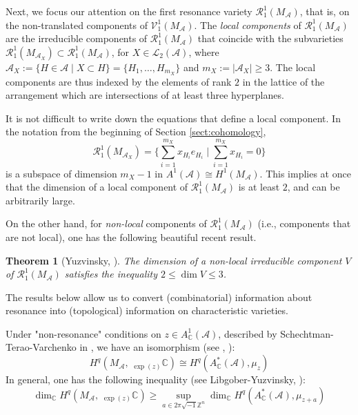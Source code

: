 \documentclass[psamsfonts]{conm-p-l}
\newtheorem{theorem}{Theorem}[section]
\theoremstyle{definition}
\theoremstyle{remark}
\numberwithin{equation}{section}
\newcommand{\A}{{\mathcal A}}
\newcommand{\RR}{{\mathcal R}}
\newcommand{\VV}{{\mathcal V}}
\newcommand{\Z}{\mathbb{Z}}
\newcommand{\C}{\mathbb{C}}
\begin{document}
Next, we focus our attention on the first resonance variety $\RR_{1}^{1}(M_{\A})$, 
that is, on the non-translated components of $\VV_{1}^{1}(M_{\A})$.
The {\it local components} of $\RR_{1}^{1}(M_{\A})$ are the irreducible components
of $\RR_{1}^{1}(M_{\A})$ that coincide with the subvarieties 
$\RR_{1}^{1}(M_{\A_{X}}) \subset \RR_{1}^{1}(M_{\A})$, for  $X\in \mathcal L_2(\A)$, 
where $\A_{X}:=\{H \in \A\;|\;X \subset H\}= \{ H_1, \dots, H_{m_X}\}$
and $m_X:=|\A_{X}| \geq 3$.  
The local components are thus indexed by the elements of rank $2$ in the lattice of
the arrangement which are intersections of at least three hyperplanes.

It is not difficult to write down the equations that define a local component.
In the notation from the beginning of Section \ref{sect:cohomology},
%
\begin{equation}
\label{RAx}
\RR_{1}^{1}(M_{\A_{X}})=\{ \sum_{i=1}^{m_X}x_{H_i}e_{H_i}\;|\;\sum_{i=1}^{m_X}x_{H_i}=0\}
\end{equation}
is a subspace of dimension $m_X-1$ in $ A^1(\A) \cong H^1(M_{\A})$. This 
implies at once that the dimension of a local component of $\RR_{1}^{1}(M_{\A})$ 
is at least $2$, and can be  arbitrarily large. 

On the other hand, for {\em non-local} components of $\RR_{1}^{1}(M_{\A})$ 
(i.e., components that are not local), one has the following beautiful recent result.

\begin{theorem}[Yuzvinsky, \cite{Y0}]
\label{yuzv}
The dimension of a non-local irreducible component $V$ of $\RR_{1}^{1}(M_{\A})$
satisfies the inequality $2 \leq \dim V \leq 3$.
\end{theorem}

 
The results below allow us to convert (combinatorial) information about resonance into 
(topological) information on characteristic varieties.

Under  "non-resonance" conditions on $z \in A^1_{\C}(\A)$, described 
by Schechtman-Terao-Varchenko in \cite{STV}, 
we have an isomorphism (see \cite{ESV}, \cite{STV}):
%
\begin{equation}
\label{eq:iso}
H^q(M_{\A}, \;_{\exp(z)}\C) \cong H^q(A^*_{\C}(\A), \mu_{z})
\end{equation}
In general, one has the following inequality (see Libgober-Yuzvinsky, \cite{LY}):
%
\begin{equation}
\label{lower}
\dim_{\C}H^q(M_{\A}, \;_{\exp(z)}\C) \geq 
\sup_{a \in 2\pi \sqrt{-1}\Z^n}\dim_{\C} H^q(A^*_{\C}(\A), \mu_{z+a})
\end{equation}
\end{document}
